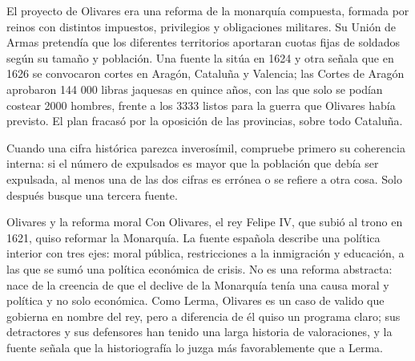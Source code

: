 \documentclass{book}
\begin{document}

\begin{tcolorbox}[title={Consejo}, studiumtip, breakable]

El proyecto de Olivares era una reforma de la monarquía compuesta, formada por reinos con distintos impuestos, privilegios y obligaciones militares. Su Unión de Armas pretendía que los diferentes territorios aportaran cuotas fijas de soldados según su tamaño y población. Una fuente la sitúa en 1624 y otra señala que en 1626 se convocaron cortes en Aragón, Cataluña y Valencia; las Cortes de Aragón aprobaron 144 000 libras jaquesas en quince años, con las que solo se podían costear 2000 hombres, frente a los 3333 listos para la guerra que Olivares había previsto. El plan fracasó por la oposición de las provincias, sobre todo Cataluña.


Cuando una cifra histórica parezca inverosímil, compruebe primero su coherencia interna: si el número de expulsados es mayor que la población que debía ser expulsada, al menos una de las dos cifras es errónea o se refiere a otra cosa. Solo después busque una tercera fuente.

\end{tcolorbox}

\begin{tcolorbox}[title={Definición}, studiumdef, breakable]

Olivares y la reforma moral
Con Olivares, el rey Felipe IV, que subió al trono en 1621, quiso reformar la Monarquía. La fuente española describe una política interior con tres ejes: moral pública, restricciones a la inmigración y educación, a las que se sumó una política económica de crisis. No es una reforma abstracta: nace de la creencia de que el declive de la Monarquía tenía una causa moral y política y no solo económica. Como Lerma, Olivares es un caso de valido que gobierna en nombre del rey, pero a diferencia de él quiso un programa claro; sus detractores y sus defensores han tenido una larga historia de valoraciones, y la fuente señala que la historiografía lo juzga más favorablemente que a Lerma.

\end{tcolorbox}
\end{document}
